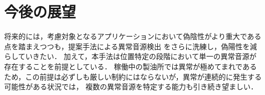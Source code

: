 \documentclass[../main]{subfiles}
\begin{document}
\section{今後の展望}
\label{sec:conc_future}
将来的には，考慮対象となるアプリケーションにおいて偽陰性がより重大である点を踏まえつつも，提案手法による異常音源検出
をさらに洗練し，偽陽性を減らしていきたい．
加えて，本手法は位置特定の段階において単一の異常音源が存在することを前提としている．
稼働中の製油所では異常が極めてまれであるため，この前提は必ずしも厳しい制約にはならないが，異常が連続的に発生する可能性がある状況では，
複数の異常音源を特定する能力も引き続き望ましい．
\end{document}
